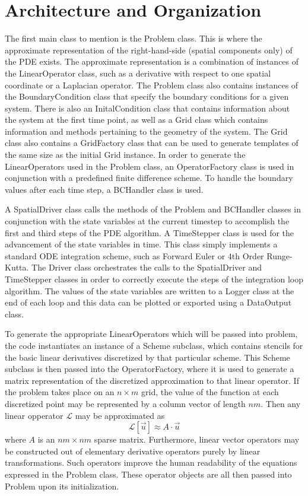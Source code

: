 \documentclass{article}
\begin{document}
	\section{Architecture and Organization}
		The first main class to mention is the Problem class. This is where the approximate representation of the right-hand-side (spatial components only) of the PDE exists. The approximate representation is a combination of instances of the LinearOperator class, such as a derivative with respect to one spatial coordinate or a Laplacian operator. The Problem class also contains instances of the BoundaryCondition class that specify the boundary conditions for a given system. There is also an InitalCondition class that contains information about the system at the first time point, as well as a Grid class which contains information and methods pertaining to the geometry of the system. The Grid class also contains a GridFactory class that can be used to generate templates of the same size as the initial Grid instance. In order to generate the LinearOperators used in the Problem class, an OperatorFactory class is used in conjunction with a predefined finite difference scheme. To handle the boundary values after each time step, a BCHandler class is used.

		A SpatialDriver class calls the methods of the Problem and BCHandler classes in conjunction with the state variables at the current timestep to accomplish the first and third steps of the PDE algorithm. A TimeStepper class is used for the advancement of the state variables in time. This class simply implements a standard ODE integration scheme, such as Forward Euler or 4th Order Runge-Kutta. The Driver class orchestrates the calls to the SpatialDriver and TimeStepper classes in order to correctly execute the steps of the integration loop algorithm. The values of the state variables are written to a Logger class at the end of each loop and this data can be plotted or exported using a DataOutput class.

		To generate the appropriate LinearOperators which will be passed into problem, the code instantiates an instance of a Scheme subclass, which contains stencils for the basic linear derivatives discretized by that particular scheme. This Scheme subclass is then passed into the OperatorFactory, where it is used to generate a matrix representation of the discretized approximation to that linear operator. If the problem takes place on an $n\times m$ grid, the value of the function at each discretized point may be represented by a column vector of length $nm$. Then any linear opperator $\mathcal{L}$ may be approximated as
		\begin{equation}
			\mathcal{L}[\vec{u}] \approx A \cdot \vec{u}
		\end{equation}
		where $A$ is an $nm \times nm$ sparse matrix. Furthermore, linear vector operators may be constructed out of elementary derivative operators purely by linear transformations. Such operators improve the human readability of the equations expressed in the Problem class. These operator objects are all then passed into Problem upon its initialization. 
\end{document}
